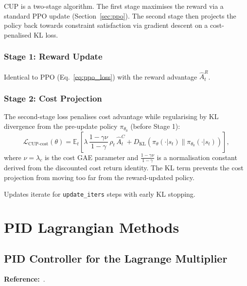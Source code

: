 \documentclass[12pt,a4paper]{article}
\theoremstyle{definition}
\newcommand{\E}{\mathbb{E}}
\newcommand{\KL}{D_{\mathrm{KL}}}
\newcommand{\lagm}{\lambda}
\begin{document}
CUP is a two-stage algorithm. The first stage maximises the reward via a standard PPO
update (Section~\ref{sec:ppo}). The second stage then projects the policy back towards
constraint satisfaction via gradient descent on a cost-penalised KL loss.

\subsubsection{Stage 1: Reward Update}

Identical to PPO (Eq.~\ref{eq:ppo_loss}) with the reward advantage $\hat{A}_t^R$.

\subsubsection{Stage 2: Cost Projection}

The second-stage loss penalises cost advantage while regularising by KL divergence from
the pre-update policy $\pi_{\theta_0}$ (before Stage 1):
\begin{equation}
  \label{eq:cup_cost_loss}
  \mathcal{L}_{\mathrm{CUP\text{-}cost}}(\theta) = \E_t\!\left[
    \lagm\,\frac{1-\gamma\nu}{1-\gamma}\,\rho_t\,\hat{A}_t^C
    + \KL(\pi_\theta(\cdot|s_t)\|\pi_{\theta_0}(\cdot|s_t))
  \right],
\end{equation}
where $\nu = \lambda_c$ is the cost GAE parameter and $\frac{1-\gamma\nu}{1-\gamma}$ is a
normalisation constant derived from the discounted cost return identity. The KL term
prevents the cost projection from moving too far from the reward-updated policy.

Updates iterate for \texttt{update\_iters} steps with early KL stopping.

\section{PID Lagrangian Methods}
\label{sec:pid}

\subsection{PID Controller for the Lagrange Multiplier}

\textbf{Reference:}~\citet{stooke2020responsive}.
\end{document}
